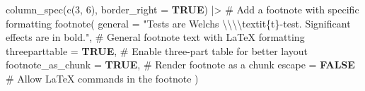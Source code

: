\documentclass[
  bookmarksnumbered]{article}
\newenvironment{Shaded}{\begin{snugshade}}{\end{snugshade}}
\newcommand{\AttributeTok}[1]{\textcolor[rgb]{0.80,0.80,0.80}{#1}}
\newcommand{\CommentTok}[1]{\textcolor[rgb]{0.50,0.62,0.50}{#1}}
\newcommand{\ConstantTok}[1]{\textcolor[rgb]{0.86,0.64,0.64}{\textbf{#1}}}
\newcommand{\DecValTok}[1]{\textcolor[rgb]{0.86,0.86,0.80}{#1}}
\newcommand{\FunctionTok}[1]{\textcolor[rgb]{0.94,0.94,0.56}{#1}}
\newcommand{\NormalTok}[1]{\textcolor[rgb]{0.80,0.80,0.80}{#1}}
\newcommand{\SpecialCharTok}[1]{\textcolor[rgb]{0.86,0.64,0.64}{#1}}
\newcommand{\StringTok}[1]{\textcolor[rgb]{0.80,0.58,0.58}{#1}}
\begin{document}
\begin{Shaded}
\begin{Highlighting}[]
  \FunctionTok{column\_spec}\NormalTok{(}\FunctionTok{c}\NormalTok{(}\DecValTok{3}\NormalTok{, }\DecValTok{6}\NormalTok{), }\AttributeTok{border\_right =} \ConstantTok{TRUE}\NormalTok{) }\SpecialCharTok{|\textgreater{}}
  \CommentTok{\# Add a footnote with specific formatting}
  \FunctionTok{footnote}\NormalTok{(}
    \AttributeTok{general =} \StringTok{"Tests are Welch\textquotesingle{}s }\SpecialCharTok{\textbackslash{}\textbackslash{}\textbackslash{}\textbackslash{}}\StringTok{textit\{t\}{-}test. Significant effects are in bold."}\NormalTok{,}
    \CommentTok{\# General footnote text with LaTeX formatting}
    \AttributeTok{threeparttable =} \ConstantTok{TRUE}\NormalTok{, }\CommentTok{\# Enable three{-}part table for better layout}
    \AttributeTok{footnote\_as\_chunk =} \ConstantTok{TRUE}\NormalTok{, }\CommentTok{\# Render footnote as a chunk}
    \AttributeTok{escape =} \ConstantTok{FALSE} \CommentTok{\# Allow LaTeX commands in the footnote}
\NormalTok{  )}
\end{Highlighting}
\end{Shaded}
\end{document}
